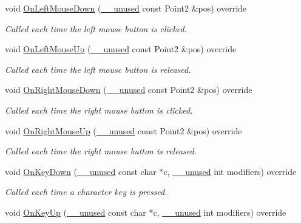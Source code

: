 \begin{DoxyCompactItemize}
void \mbox{\hyperlink{class_graphics_arena_viewer_adf2fb01c3ca8b1774f031d68616b288c}{On\+Left\+Mouse\+Down}} (\mbox{\hyperlink{common_8h_a2e3484535ee610c8e19e9859563abe48}{\+\_\+\+\_\+unused}} const Point2 \&pos) override
\begin{DoxyCompactList}\small\item\em Called each time the left mouse button is clicked. \end{DoxyCompactList}\item 
void \mbox{\hyperlink{class_graphics_arena_viewer_abe4f11ab9bfb6055280ddf2b671d7032}{On\+Left\+Mouse\+Up}} (\mbox{\hyperlink{common_8h_a2e3484535ee610c8e19e9859563abe48}{\+\_\+\+\_\+unused}} const Point2 \&pos) override
\begin{DoxyCompactList}\small\item\em Called each time the left mouse button is released. \end{DoxyCompactList}\item 
void \mbox{\hyperlink{class_graphics_arena_viewer_a178a9f09ff241d4dc032b6d0998cc9c6}{On\+Right\+Mouse\+Down}} (\mbox{\hyperlink{common_8h_a2e3484535ee610c8e19e9859563abe48}{\+\_\+\+\_\+unused}} const Point2 \&pos) override
\begin{DoxyCompactList}\small\item\em Called each time the right mouse button is clicked. \end{DoxyCompactList}\item 
void \mbox{\hyperlink{class_graphics_arena_viewer_a5dfa16dca83575e253b6d3ea344f8746}{On\+Right\+Mouse\+Up}} (\mbox{\hyperlink{common_8h_a2e3484535ee610c8e19e9859563abe48}{\+\_\+\+\_\+unused}} const Point2 \&pos) override
\begin{DoxyCompactList}\small\item\em Called each time the right mouse button is released. \end{DoxyCompactList}\item 
void \mbox{\hyperlink{class_graphics_arena_viewer_ab0001d4a3ebde2b1f5b4cb7770824726}{On\+Key\+Down}} (\mbox{\hyperlink{common_8h_a2e3484535ee610c8e19e9859563abe48}{\+\_\+\+\_\+unused}} const char $\ast$c, \mbox{\hyperlink{common_8h_a2e3484535ee610c8e19e9859563abe48}{\+\_\+\+\_\+unused}} int modifiers) override
\begin{DoxyCompactList}\small\item\em Called each time a character key is pressed. \end{DoxyCompactList}\item 
void \mbox{\hyperlink{class_graphics_arena_viewer_ac3e749f6a75bdd5b32d23c9c8913f9d8}{On\+Key\+Up}} (\mbox{\hyperlink{common_8h_a2e3484535ee610c8e19e9859563abe48}{\+\_\+\+\_\+unused}} const char $\ast$c, \mbox{\hyperlink{common_8h_a2e3484535ee610c8e19e9859563abe48}{\+\_\+\+\_\+unused}} int modifiers) override

\end{DoxyCompactItemize}

